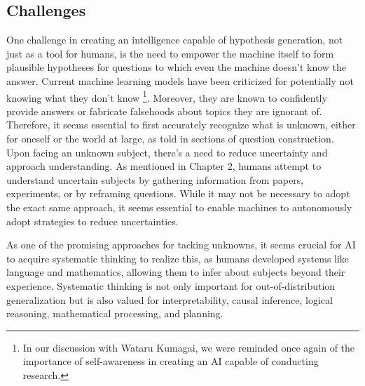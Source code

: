 \subsection{Challenges}
One challenge in creating an intelligence capable of hypothesis generation, not just as a tool for humans, is the need to empower the machine itself to form plausible hypotheses for questions to which even the machine doesn't know the answer. Current machine learning models have been criticized for potentially not knowing what they don't know \footnote{
In our discussion with Wataru Kumagai, we were reminded once again of the importance of self-awareness in creating an AI capable of conducting research.
}. 
Moreover, they are known to confidently provide answers or fabricate falsehoods about topics they are ignorant of. Therefore, it seems essential to first accurately recognize what is unknown, either for oneself or the world at large, as told in sections of question construction. Upon facing an unknown subject, there's a need to reduce uncertainty and approach understanding. As mentioned in Chapter 2, humans attempt to understand uncertain subjects by gathering information from papers, experiments, or by reframing questions. While it may not be necessary to adopt the exact same approach, it seems essential to enable machines to autonomously adopt strategies to reduce uncertainties.



As one of the promising approaches for tacking unknowns, it seems crucial for AI to acquire systematic thinking to realize this, as humans developed systems like language and mathematics, allowing them to infer about subjects beyond their experience. Systematic thinking is not only important for out-of-distribution generalization but is also valued for interpretability, causal inference, logical reasoning, mathematical processing, and planning.

